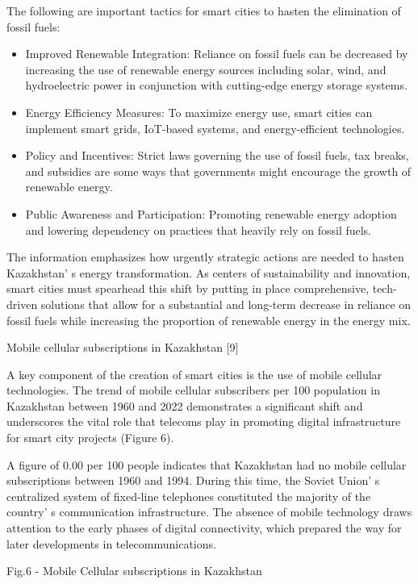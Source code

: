 The following are important tactics for smart cities to hasten the
elimination of fossil fuels:

\begin{itemize}
\item
  Improved Renewable Integration: Reliance on fossil fuels can be
  decreased by increasing the use of renewable energy sources including
  solar, wind, and hydroelectric power in conjunction with cutting-edge
  energy storage systems.
\item
  Energy Efficiency Measures: To maximize energy use, smart cities can
  implement smart grids, IoT-based systems, and energy-efficient
  technologies.
\item
  Policy and Incentives: Strict laws governing the use of fossil fuels,
  tax breaks, and subsidies are some ways that governments might
  encourage the growth of renewable energy.
\item
  Public Awareness and Participation: Promoting renewable energy
  adoption and lowering dependency on practices that heavily rely on
  fossil fuels.
\end{itemize}

The information emphasizes how urgently strategic actions are needed to
hasten Kazakhstan' s energy transformation. As centers of
sustainability and innovation, smart cities must spearhead this shift by
putting in place comprehensive, tech-driven solutions that allow for a
substantial and long-term decrease in reliance on fossil fuels while
increasing the proportion of renewable energy in the energy mix.

Mobile cellular subscriptions in Kazakhstan {[}9{]}

A key component of the creation of smart cities is the use of mobile
cellular technologies. The trend of mobile cellular subscribers per 100
population in Kazakhstan between 1960 and 2022 demonstrates a
significant shift and underscores the vital role that telecoms play in
promoting digital infrastructure for smart city projects (Figure 6).

A figure of 0.00 per 100 people indicates that Kazakhstan had no mobile
cellular subscriptions between 1960 and 1994. During this time, the
Soviet Union' s centralized system of fixed-line
telephones constituted the majority of the country' s
communication infrastructure. The absence of mobile technology draws
attention to the early phases of digital connectivity, which prepared
the way for later developments in telecommunications.

Fig.6 - Mobile Cellular subscriptions in Kazakhstan

